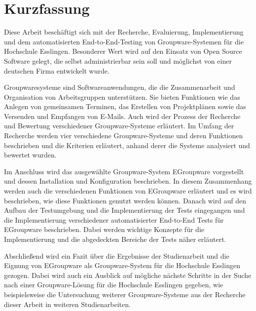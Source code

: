 \chapter{Kurzfassung}

Diese Arbeit beschäftigt sich mit der Recherche, Evaluierung, Implementierung und dem automatisierten End-to-End-Testing von Groupware-Systemen für die Hochschule Esslingen.
Besonderer Wert wird auf den Einsatz von Open Source Software gelegt, die selbst administrierbar sein soll und möglichst von einer deutschen Firma entwickelt wurde.

Groupwaresysteme sind Softwareanwendungen, die die Zusammenarbeit und Organisation von Arbeitsgruppen unterstützen.
Sie bieten Funktionen wie das Anlegen von gemeinsamen Terminen, das Erstellen von Projektplänen sowie das Versenden und Empfangen von E-Mails.
Auch wird der Prozess der Recherche und Bewertung verschiedener Groupware-Systeme erläutert.
Im Umfang der Recherche werden vier verschiedene Groupware-Systeme und deren Funktionen beschrieben und die Kriterien erläutert, anhand derer die Systeme analysiert und bewertet wurden.

Im Anschluss wird das ausgewählte Groupware-System EGroupware vorgestellt und dessen Installation und Konfiguration beschrieben.
In diesem Zusammenhang werden auch die verschiedenen Funktionen von EGroupware erläutert und es wird beschrieben, wie diese Funktionen genutzt werden können.
Danach wird auf den Aufbau der Testumgebung und die Implementierung der Tests eingegangen und die Implementierung verschiedener automatisierter End-to-End Tests für EGroupware beschrieben.
Dabei werden wichtige Konzepte für die Implementierung und die abgedeckten Bereiche der Tests näher erläutert.

Abschließend wird ein Fazit über die Ergebnisse der Studienarbeit und die Eignung von EGroupware als Groupware-System für die Hochschule Esslingen gezogen.
Dabei wird auch ein Ausblick auf mögliche nächste Schritte in der Suche nach einer Groupware-Lösung für die Hochschule Esslingen gegeben, wie beispielsweise die Untersuchung weiterer Groupware-Systeme aus der Recherche dieser Arbeit in weiteren Studienarbeiten.